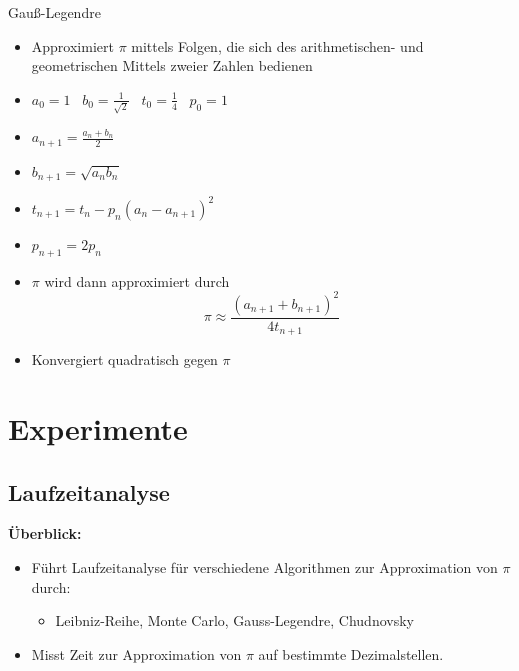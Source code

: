 \documentclass[9pt, t]{beamer}
\begin{document}
\begin{frame}{Gauß-Legendre}                                                                                                        %
    \begin{itemize}
        \item<1-> Approximiert \(\pi\) mittels Folgen, die sich des arithmetischen- und geometrischen Mittels zweier Zahlen bedienen
        \item<2-> \( a_0 = 1 \;\;\; b_0 = \frac{1}{\sqrt{2}} \;\;\; t_0 = \frac{1}{4} \;\;\; p_0 = 1 \)
        \item<3-> \( a_{n+1} = \frac{a_n + b_n}{2} \)
        \item<4-> \( b_{n+1} = \sqrt{a_nb_n} \)
        \item<5-> \( t_{n+1} = t_n - p_n(a_n - a_{n+1})^2 \)
        \item<6-> \( p_{n+1} = 2p_n \)
        \item<7-> \(\pi\) wird dann approximiert durch \[ \pi \approx \frac{(a_{n+1} + b_{n+1})^2}{4t_{n+1}} \]
        \item<8-> Konvergiert quadratisch gegen \(\pi\) \cite{Gauß-Legendre}
    \end{itemize}
\end{frame}

\section{Experimente}

\subsection{Laufzeitanalyse}

\begin{frame}
    \textbf{Überblick:}
    \begin{itemize}
        \item Führt Laufzeitanalyse für verschiedene Algorithmen zur
              Approximation von \(\pi\) durch:
              \begin{itemize}
                  \item Leibniz-Reihe, Monte Carlo, Gauss-Legendre, Chudnovsky
              \end{itemize}
        \item Misst Zeit zur Approximation von \(\pi\) auf bestimmte
              Dezimalstellen.
    \end{itemize}

\end{frame}
\end{document}

